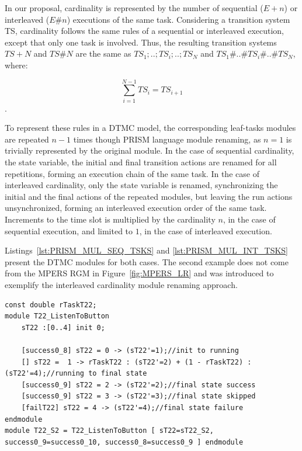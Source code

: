 In our proposal, cardinality is represented by the number of sequential ($E+n$) or interleaved ($E\#n$) executions of the same task. Considering a transition system TS, cardinality follows the same rules of a sequential or interleaved execution, except that only one task is involved. Thus, the resulting transition systems $TS+N$ and $TS\#N$ are the same as $TS_1;..;TS_i;..;TS_N$ and $TS_1\#..\#TS_i\#..\#TS_N$, where: 

$$\sum_{i=1}^{N-1} TS_{i}=TS_{i+1}$$.

To represent these rules in a DTMC model, the corresponding leaf-tasks modules are repeated $n - 1$ times though PRISM language module renaming, as $n=1$ is trivially represented by the original module. In the case of sequential cardinality, the state variable, the initial and final transition actions are renamed for all repetitions, forming an execution chain of the same task. In the case of interleaved cardinality, only the state variable is renamed, synchronizing the initial and the final actions of the repeated modules, but leaving the run actions unsynchronized, forming an interleaved execution order of the same task. Increments to the time slot is multiplied by the cardinality $n$, in the case of sequential execution, and limited to $1$, in the case of interleaved execution.

Listings~\ref{lst:PRISM_MUL_SEQ_TSKS} and \ref{lst:PRISM_MUL_INT_TSKS} present the DTMC modules for both cases. The second example does not come from the MPERS RGM in Figure~\ref{fig:MPERS_LR} and was introduced to exemplify the interleaved cardinality module renaming approach.
\medskip



\begin{lstlisting}[language=Prism, caption={Sequential cardinality with n=2 for task T22.},label={lst:PRISM_MUL_SEQ_TSKS}] 
const double rTaskT22;
module T22_ListenToButton
	sT22 :[0..4] init 0;	

	[success0_8] sT22 = 0 -> (sT22'=1);//init to running
	[] sT22 =  1 -> rTaskT22 : (sT22'=2) + (1 - rTaskT22) : (sT22'=4);//running to final state
	[success0_9] sT22 = 2 -> (sT22'=2);//final state success
	[success0_9] sT22 = 3 -> (sT22'=3);//final state skipped
	[failT22] sT22 = 4 -> (sT22'=4);//final state failure
endmodule
module T22_S2 = T22_ListenToButton [ sT22=sT22_S2, success0_9=success0_10, success0_8=success0_9 ] endmodule
\end{lstlisting}
\medskip

